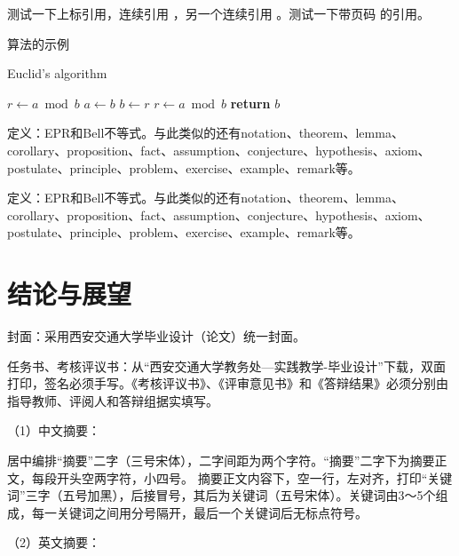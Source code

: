 测试一下上标引用，连续引用
\cite{newman2001random,aiello2000random,bollobas2001random}，另一个连续引用
\cite{newman2001random,bollobas2001random,barabasi1999emergence}。测试一下带页码
的引用\cite[124--128]{erdHos1961strength}。

算法的示例

\begin{algorithm}
    \caption{Euclid’s algorithm}
    \label{alg:euclid}
    \begin{algorithmic}[1]
        \State $r\gets a\bmod b$
        \State $a\gets b$
        \State $b\gets r$
        \State $r\gets a\bmod b$
        \EndWhile\label{euclidendwhile}
       \State \textbf{return} $b$
       \EndProcedure
   \end{algorithmic}
\end{algorithm}


\begin{definition}
定义：EPR和Bell不等式。与此类似的还有notation、theorem、lemma、corollary、proposition、fact、assumption、conjecture、hypothesis、axiom、postulate、principle、problem、exercise、example、remark等。
\end{definition}
\begin{theorem}
定义：EPR和Bell不等式。与此类似的还有notation、theorem、lemma、corollary、proposition、fact、assumption、conjecture、hypothesis、axiom、postulate、principle、problem、exercise、example、remark等。
\end{theorem}

\section{结论与展望}
封面：采用西安交通大学毕业设计（论文）统一封面。

任务书、考核评议书：从“西安交通大学教务处—实践教学-毕业设计”下载，双面打印，签名必须手写。《考核评议书》、《评审意见书》和《答辩结果》必须分别由指导教师、评阅人和答辩组据实填写。

（1）中文摘要：

居中编排“摘要”二字（三号宋体），二字间距为两个字符。“摘要”二字下为摘要正文，每段开头空两字符，小四号。
摘要正文内容下，空一行，左对齐，打印“关键词”三字（五号加黑），后接冒号，其后为关键词（五号宋体）。关键词由3～5个组成，每一关键词之间用分号隔开，最后一个关键词后无标点符号。

（2）英文摘要：

